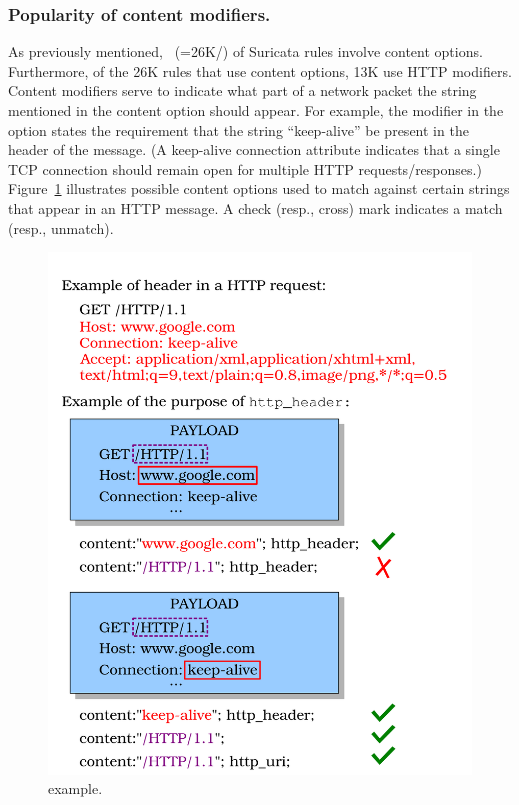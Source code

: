 \documentclass[sigconf,review, anonymous]{acmart}
\begin{document}
\subsubsection{Popularity of content modifiers.} As previously
mentioned, \percRulesWithContent\ (=26K/\numrulessuri) of Suricata
rules involve content options. Furthermore, of the 26K rules that use
content options, 13K use HTTP modifiers.  Content modifiers
serve to indicate what part of a network packet the string mentioned
in the content option should appear. For example, the modifier
 in the option  states the requirement that the string ``keep-alive''
be present in the header of the message. (A keep-alive connection
attribute indicates that a single TCP connection should remain open
for multiple HTTP requests/responses.)
Figure~\ref{fig:http-header-example} illustrates possible content
options used to match against certain strings that appear in an HTTP
message. A check (resp., cross) mark indicates a match (resp.,
unmatch).

\begin{figure}[t!]
\centering
\includegraphics[scale=0.5]{figs/http_header-example.png}
\caption{ example.}
\label{fig:http-header-example}
\end{figure}
\end{document}
